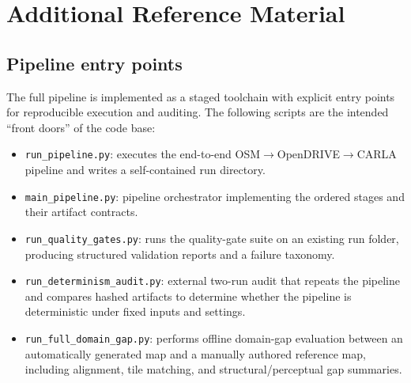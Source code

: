 \appendix
\thispagestyle{myPageStyle}



\section{Additional Reference Material}
\label{sec:appendix_additional}

\subsection{Pipeline entry points}
\label{sec:appendix_entrypoints}
The full pipeline is implemented as a staged toolchain with explicit entry points for reproducible execution and auditing. 
The following scripts are the intended ``front doors'' of the code base:

\begin{itemize}
\item \texttt{run\_pipeline.py}: executes the end-to-end OSM$\rightarrow$OpenDRIVE$\rightarrow$CARLA pipeline and writes a self-contained run directory.
\item \texttt{main\_pipeline.py}: pipeline orchestrator implementing the ordered stages and their artifact contracts.
\item \texttt{run\_quality\_gates.py}: runs the quality-gate suite on an existing run folder, producing structured validation reports and a failure taxonomy.
\item \texttt{run\_determinism\_audit.py}: external two-run audit that repeats the pipeline and compares hashed artifacts to determine whether the pipeline is deterministic under fixed inputs and settings.
\item \texttt{run\_full\_domain\_gap.py}: performs offline domain-gap evaluation between an automatically generated map and a manually authored reference map, including alignment, tile matching, and structural/perceptual gap summaries.
\end{itemize}

